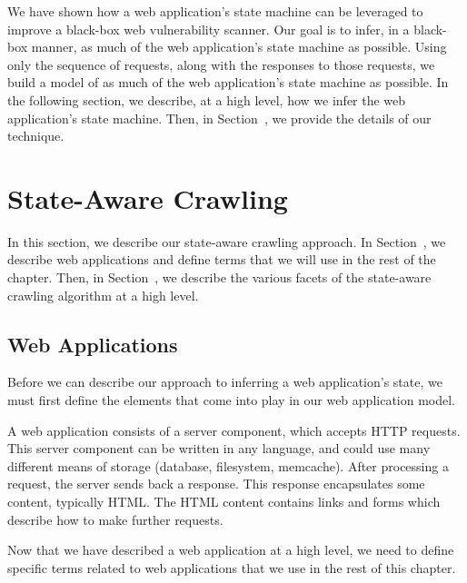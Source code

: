 We have shown how a web application's state machine can be leveraged to improve
a black-box web vulnerability scanner. Our goal is to infer, in a black-box
manner, as much of the web application's state machine as possible. Using only
the sequence of requests, along with the responses to those requests, we build
a model of as much of the web application's state machine as possible. In the
following section, we describe, at a high level, how we infer the web
application's state machine. Then, in Section~, we provide the
details of our technique.

\section{State-Aware Crawling}

In this section, we describe our state-aware crawling approach. In
Section~, we describe web applications and define terms that we
will use in the rest of the chapter. Then, in Section~, we
describe the various facets of the state-aware crawling algorithm at a high
level.

\subsection{Web Applications}

Before we can describe our approach to inferring a web application's state, we
must first define the elements that come into play in our web application model.

A web application consists of a server component, which accepts HTTP requests.
This server component can be written in any language, and could use many
different means of storage (database, filesystem, memcache). After
processing a request, the server sends back a response. This response
encapsulates some content, typically HTML. The HTML content contains links and
forms which describe how to make further requests. 

Now that we have described a web application at a high level, we need to define
specific terms related to web applications that we use in the rest of this chapter.

